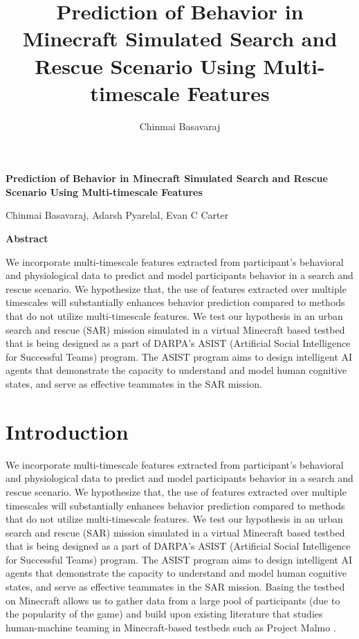 \documentclass{article}
\title{Prediction of Behavior in Minecraft Simulated Search and Rescue Scenario Using Multi-timescale Features}
\author{Chinmai Basavaraj}
\begin{document}
\onehalfspacing

\begin{titlepage}
\begin{center}
    \Large{
    \textbf{Prediction of Behavior in Minecraft Simulated Search and 
    Rescue Scenario Using Multi-timescale Features}}
    \vspace{0.5cm}
    
    Chinmai Basavaraj, Adarsh Pyarelal, Evan C Carter 
    
    \Large{
    \vspace{0.9cm}
    \textbf{Abstract}}

\end{center}

We incorporate multi-timescale features extracted from participant’s behavioral
and physiological data to predict and model participants behavior in a search and 
rescue scenario. We hypothesize that, the use of features extracted over multiple
timescales will substantially enhances behavior prediction compared to 
methods that do not utilize multi-timescale features. We test our hypothesis in 
an urban search and rescue (SAR) mission simulated in a virtual Minecraft based 
testbed that is being designed as a part of DARPA’s ASIST 
(Artificial Social Intelligence for Successful Teams) program. The ASIST program aims
to design intelligent AI agents that demonstrate the capacity to understand 
and model human cognitive states, and serve as effective teammates in the SAR mission.
\end{titlepage}


\section*{Introduction}

We incorporate multi-timescale features extracted from participant’s behavioral
and physiological data to predict and model participants behavior in a search and 
rescue scenario. We hypothesize that, the use of features extracted over multiple
timescales will substantially enhances behavior prediction compared to 
methods that do not utilize multi-timescale features. We test our hypothesis in 
an urban search and rescue (SAR) mission simulated in a virtual Minecraft based 
testbed that is being designed as a part of DARPA’s ASIST 
(Artificial Social Intelligence for Successful Teams) program. The ASIST program aims
to design intelligent AI agents that demonstrate the capacity to understand 
and model human cognitive states, and serve as effective teammates in the SAR mission.
Basing the testbed on Minecraft allows us to gather data from a large pool of 
participants (due to the popularity of the game) and build upon existing literature 
that studies human-machine teaming in Minecraft-based testbeds such as Project 
Malmo \citep{johnson_malmo_nodate}.
\end{document}

